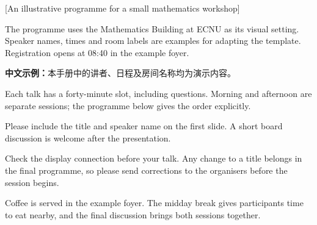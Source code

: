\documentclass[a4paper,11pt,twoside]{article}
\begin{document}
\ifprintmode
  \null\thispagestyle{empty}\newpage
\fi
{}
\hypersetup{pageanchor=true}










\tableofcontents
{}
\clearpage










[An illustrative programme for a small mathematics workshop]

\begin{infobox}
  The programme uses the Mathematics Building at ECNU as its visual setting.
  Speaker names, times and room labels are examples for adapting the template.
  Registration opens at 08:40 in the example foyer.

  \textbf{中文示例：}本手册中的讲者、日程及房间名称均为演示内容。
\end{infobox}

\begin{sessionbox}
  Each talk has a forty-minute slot, including questions. Morning and afternoon
  are separate sessions; the programme below gives the order explicitly.
\end{sessionbox}

\begin{talkbox}
  Please include the title and speaker name on the first slide. A short board
  discussion is welcome after the presentation.
\end{talkbox}

\begin{noticebox}
  Check the display connection before your talk. Any change to a title belongs
  in the final programme, so please send corrections to the organisers before
  the session begins.
\end{noticebox}

\begin{breakbox}[Refreshments]
  Coffee is served in the example foyer. The midday break gives participants
  time to eat nearby, and the final discussion brings both sessions together.
\end{breakbox}
\end{document}
